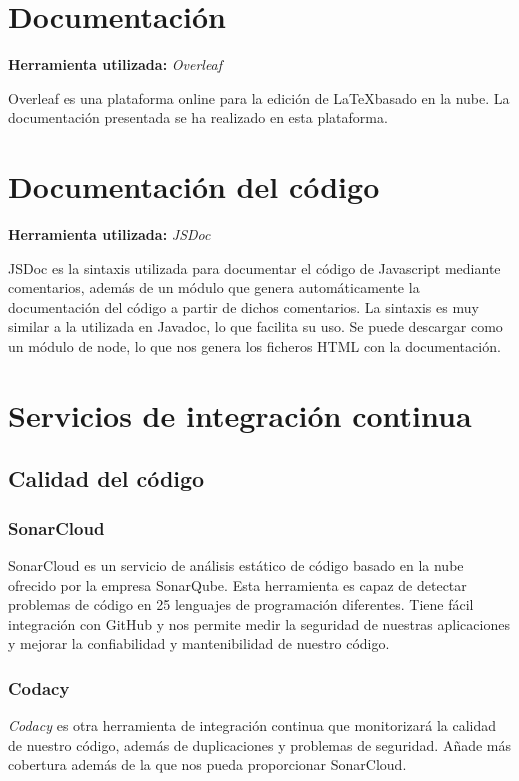\section{Documentación}
\textbf{Herramienta utilizada: }\emph{Overleaf}

Overleaf es una plataforma online para la edición de \LaTeX basado en la nube. La documentación presentada se ha realizado en esta plataforma.

\section{Documentación del código}
\textbf{Herramienta utilizada: }\emph{JSDoc}

JSDoc es la sintaxis utilizada para documentar el código de Javascript mediante comentarios, además de un módulo que genera automáticamente la documentación del código a partir de dichos comentarios. La sintaxis es muy similar a la utilizada en Javadoc, lo que facilita su uso. Se puede descargar como un módulo de node, lo que nos genera los ficheros HTML con la documentación.

\section{Servicios de integración continua}
\subsection{Calidad del código}
\subsubsection{SonarCloud}
SonarCloud es un servicio de análisis estático de código basado en la nube ofrecido por la empresa SonarQube. Esta herramienta es capaz de detectar problemas de código en 25 lenguajes de programación diferentes. Tiene fácil integración con GitHub y nos permite medir la seguridad de nuestras aplicaciones y mejorar la confiabilidad y mantenibilidad de nuestro código\cite{platzi:sonarcloud}.

\subsubsection{Codacy}
\emph{Codacy} es otra herramienta de integración continua que monitorizará la calidad de nuestro código, además de duplicaciones y problemas de seguridad. Añade más cobertura además de la que nos pueda proporcionar SonarCloud.

